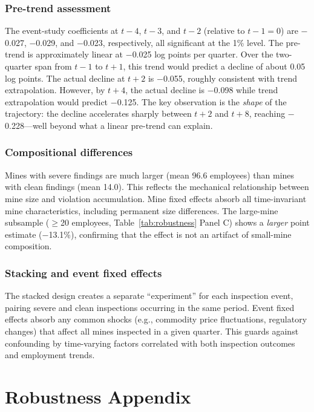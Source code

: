 \documentclass[12pt]{article}
\begin{document}
\subsubsection*{Pre-trend assessment} The event-study coefficients at $t-4$, $t-3$, and $t-2$ (relative to $t-1 = 0$) are $-$0.027, $-$0.029, and $-$0.023, respectively, all significant at the 1\% level. The pre-trend is approximately linear at $-$0.025 log points per quarter. Over the two-quarter span from $t-1$ to $t+1$, this trend would predict a decline of about 0.05 log points. The actual decline at $t+2$ is $-$0.055, roughly consistent with trend extrapolation. However, by $t+4$, the actual decline is $-$0.098 while trend extrapolation would predict $-$0.125. The key observation is the \textit{shape} of the trajectory: the decline accelerates sharply between $t+2$ and $t+8$, reaching $-$0.228---well beyond what a linear pre-trend can explain.

\subsubsection*{Compositional differences} Mines with severe findings are much larger (mean 96.6 employees) than mines with clean findings (mean 14.0). This reflects the mechanical relationship between mine size and violation accumulation. Mine fixed effects absorb all time-invariant mine characteristics, including permanent size differences. The large-mine subsample ($\geq$20 employees, Table~\ref{tab:robustness} Panel C) shows a \textit{larger} point estimate ($-$13.1\%), confirming that the effect is not an artifact of small-mine composition.

\subsubsection*{Stacking and event fixed effects} The stacked design creates a separate ``experiment'' for each inspection event, pairing severe and clean inspections occurring in the same period. Event fixed effects absorb any common shocks (e.g., commodity price fluctuations, regulatory changes) that affect all mines inspected in a given quarter. This guards against confounding by time-varying factors correlated with both inspection outcomes and employment trends.


\section{Robustness Appendix}
\label{app:robustness}
\end{document}
